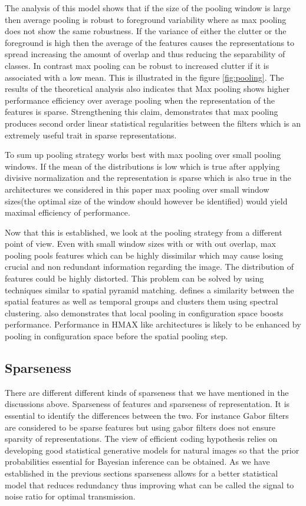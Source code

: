 \documentclass[12pt,twoside]{article}
\theoremstyle{plain}
\theoremstyle{definition}
\theoremstyle{remark}
\begin{document}
The analysis of this model\cite{Y-LanBoureau2010a} shows that if the size of the pooling window is large then average pooling is robust to foreground variability where as max pooling does not show the same robustness. If the variance of either the clutter or the foreground is high then the average of the features causes the representations to spread increasing the amount of overlap\cite{Y-LanBoureau2010a} and thus reducing the separability of classes. In contrast max pooling can be robust to increased clutter if it is associated with a low mean. This is illustrated in the figure \ref{fig:pooling}. The results of the theoretical analysis also indicates that Max pooling shows higher performance efficiency over average pooling when the representation of the features is sparse. Strengthening this claim, \cite{XiaolinHu2014} demonstrates that max pooling produces second order linear statistical regularities between the filters which is an extremely useful trait in sparse representations. 

To sum up pooling strategy works best with max pooling over small pooling windows. If the mean of the distributions is low which is true after applying divisive normalization and the representation is sparse which is also true in the architectures we considered in this paper max pooling over small window sizes(the optimal size of the window should however be identified) would yield maximal efficiency of performance. 

Now that this is established, we look at the pooling strategy from a different point of view. Even with small window sizes with or with out overlap, max pooling pools features which can be highly dissimilar which may cause losing crucial and non redundant information regarding the image. The distribution of features could be highly distorted. This problem can be solved by using techniques similar to spatial pyramid matching. \cite{MarkusLessmann2014} defines a similarity between the spatial features as well as temporal groups and clusters them using spectral clustering. \cite{Y-LanBoureau2011} also demonstrates that local pooling in configuration space boosts performance. Performance in HMAX like architectures is likely to be enhanced by pooling in configuration space before the spatial pooling step. 
\subsection{Sparseness}
\label{Subsec:Sparsness}
There are different different kinds of sparseness that we have mentioned in the discussions above. Sparseness of features and sparseness of representation. It is essential to identify the differences between the two. For instance Gabor filters are considered to be sparse features but using gabor filters does not ensure sparsity of representations. The view of efficient coding hypothesis relies on developing good statistical generative models for natural images so that the prior probabilities essential for Bayesian inference can be obtained\cite{AapoHyvaerinen2009}. As we have established in the previous sections sparseness allows for a better statistical model that reduces redundancy thus improving what can be called the signal to noise ratio for optimal transmission. 
\end{document}
